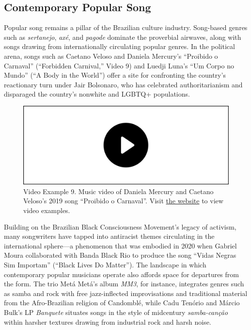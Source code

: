\documentclass[twoside]{article}
\providecommand{\wmturlcaption}{
  Visit \href{https://worldmusictextbook.org/mcnally-2021}{the website} to view video examples.
}
\begin{document}
\hypertarget{contemporary-popular-song}{%
\subsection*{Contemporary Popular Song}\label{contemporary-popular-song}}

Popular song remains a pillar of the Brazilian culture industry.
Song-based genres such as \emph{sertanejo}, \emph{axé}, and
\emph{pagode} dominate the proverbial airwaves, along with songs drawing
from internationally circulating popular genres. In the political arena,
songs such as Caetano Veloso and Daniela Mercury's ``Proibido o
Carnaval'' (``Forbidden Carnival,'' Video 9) and Luedji Luna's ``Um
Corpo no Mundo'' (``A Body in the World'') offer a site for confronting
the country's reactionary turn under Jair Bolsonaro, who has celebrated
authoritarianism and disparaged the country's nonwhite and LGBTQ+
populations.

\begin{figure}
  \includegraphics[width=\textwidth]{../play-video.png}
  \caption*{Video Example 9. Music video of Daniela Mercury and Caetano Veloso's 2019
  song ``Proibido o Carnaval''. \wmturlcaption}
\end{figure}

Building on the Brazilian Black Consciousness Movement's legacy of
activism, many songwriters have tapped into antiracist themes
circulating in the international sphere---a phenomenon that was embodied
in 2020 when Gabriel Moura collaborated with Banda Black Rio to produce
the song ``Vidas Negras Sim Importam'' (``Black Lives Do Matter''). The
landscape in which contemporary popular musicians operate also affords
space for departures from the form. The trio Metá Metá's album
\emph{MM3}, for instance, integrates genres such as samba and rock with
free jazz-inflected improvisations and traditional material from the
Afro-Brazilian religion of Candomblé, while Cadu Tenório and Márcio
Bulk's LP \emph{Banquete} situates songs in the style of midcentury
\emph{samba-canção} within harsher textures drawing from industrial rock
and harsh noise.
\end{document}

